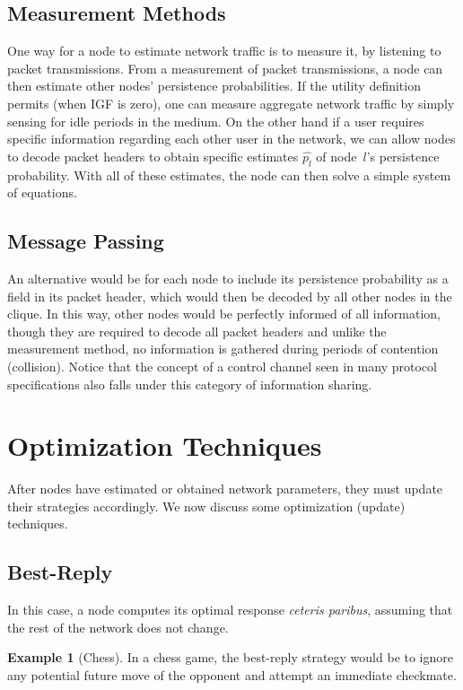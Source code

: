 \documentclass[11pt]{IEEEtran}
\theoremstyle{definition}
\newtheorem{example}{Example}
\begin{document}
\subsection{Measurement Methods}

One way for a node to estimate network traffic is to measure it, by listening to packet transmissions.  From a measurement of packet transmissions, a node can then estimate other nodes' persistence probabilities.  If the utility definition permits (when IGF is zero), one can measure aggregate network traffic by simply sensing for idle periods in the medium. On the other hand if a user requires specific information regarding each other user in the network, we can allow nodes to decode packet headers to obtain specific estimates $\hat{p_l}$ of node~$l$'s persistence probability.  With all of these estimates, the node can then solve a simple system of equations.

\subsection{Message Passing}

An alternative would be for each node to include its persistence probability as a field in its packet header, which would then be decoded by all other nodes in the clique. In this way, other nodes would be perfectly informed of all information, though they are required to decode all packet headers and unlike the measurement method, no information is gathered during periods of contention (collision). Notice that the concept of a control channel seen in many protocol specifications also falls under this category of information sharing.

\section{Optimization Techniques}

After nodes have estimated or obtained network parameters, they must update
their strategies accordingly.  We now discuss some optimization (update) techniques. 

\subsection{Best-Reply}

In this case, a node computes its optimal response \emph{ceteris paribus}, assuming that the rest of the network does not change. 
 \begin{example}[Chess]
In a chess game, the best-reply strategy would be to ignore
any potential future move of the opponent and attempt an immediate checkmate. 
\end{example}
\end{document}

